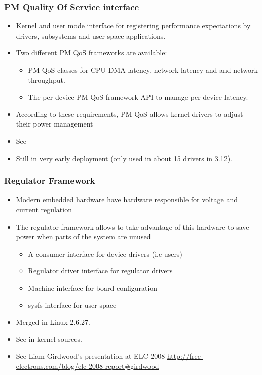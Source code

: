 \begin{frame}
  \frametitle{PM Quality Of Service interface}
  \begin{itemize}
  \item Kernel and user mode interface for registering
        performance expectations by drivers, subsystems and user space
        applications.
  \item Two different PM QoS frameworks are available:
    \begin{itemize}
       \item PM QoS classes for CPU DMA latency, network latency and 
             and network throughput.
       \item The per-device PM QoS framework API to manage per-device
	     latency.
    \end{itemize}
  \item According to these requirements, PM QoS allows kernel drivers
        to adjust their power management
  \item See 
  \item Still in very early deployment (only used in about 15 drivers in
        3.12).
  \end{itemize}
\end{frame}

\begin{frame}
  \frametitle{Regulator Framework}
  \begin{itemize}
  \item Modern embedded hardware have hardware responsible for voltage
    and current regulation
  \item The regulator framework allows to take advantage of this
    hardware to save power when parts of the system are unused
    \begin{itemize}
    \item A consumer interface for device drivers (i.e users)
    \item Regulator driver interface for regulator drivers
    \item Machine interface for board configuration
    \item sysfs interface for user space
    \end{itemize}
  \item Merged in Linux 2.6.27.
  \item See  in kernel sources.
  \item See Liam Girdwood's presentation at ELC 2008
    \url{http://free-electrons.com/blog/elc-2008-report\#girdwood}
  \end{itemize}
\end{frame}

